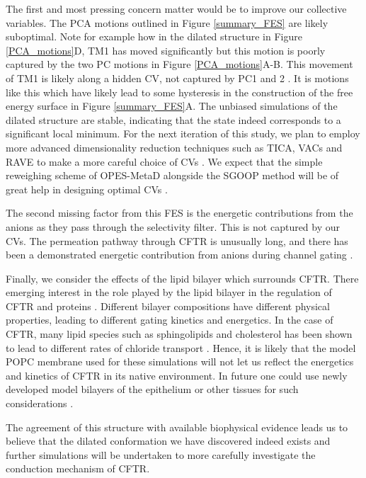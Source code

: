 The first and most pressing concern matter would be to improve our collective variables. The PCA motions outlined in Figure \ref{summary_FES} are likely suboptimal. Note for example how in the dilated structure in Figure \ref{PCA_motions}D, TM1 has moved significantly but this motion is poorly captured by the two PC motions in Figure \ref{PCA_motions}A-B. This movement of TM1 is likely along a hidden CV, not captured by PC1 and 2 \cite{bussi2015, bussi2020a}. It is motions like this which have likely lead to some hysteresis in the construction of the free energy surface in Figure \ref{summary_FES}A. The unbiased simulations of the dilated structure are stable, indicating that the state indeed corresponds to a significant local minimum. For the next iteration of this study, we plan to employ more advanced dimensionality reduction techniques such as TICA, VACs and RAVE to make a more careful choice of CVs \cite{}. We expect that the simple reweighing scheme of OPES-MetaD alongside the SGOOP method will be of great help in designing optimal CVs \cite{invernizzi2020, invernizzi2022, smith2018, tiwary2016b}. 

The second missing factor from this FES is the energetic contributions from the anions as they pass through the selectivity filter. This is not captured by our CVs. The permeation pathway through CFTR is unusually long, and there has been a demonstrated energetic contribution from anions during channel gating \cite{gong2004, gong2003, gong2003a, tabcharani1993, zhou2002, sorum2015, yeh2015}. 

Finally, we consider the effects of the lipid bilayer which surrounds CFTR. There emerging interest in the role played by the lipid bilayer in the regulation of CFTR and proteins \cite{cottrill2020, lin2022, kapoor2021}. Different bilayer compositions have different physical properties, leading to different gating kinetics and energetics. In the case of CFTR, many lipid species such as sphingolipids and cholesterol has been shown to lead to different rates of chloride transport \cite{aureli2016, farinha2018, cottrill2020}. Hence, it is likely that the model POPC membrane used for these simulations will not let us reflect the energetics and kinetics of CFTR in its native environment. In future one could use newly developed model bilayers of the epithelium or other tissues for such considerations \cite{wilson2021}.

The agreement of this structure with available biophysical evidence leads us to believe that the dilated conformation we have discovered indeed exists and further simulations will be undertaken to more carefully investigate the conduction mechanism of CFTR. 

